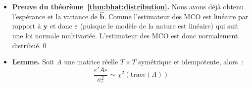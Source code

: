 \documentclass[10pt]{beamer}
\begin{document}
\begin{notes}

  \begin{itemize}

  \item \textbf{Preuve du théorème~\ref{thm:bhat:distribution}.} Nous avons déjà obtenu l'espérance et la variance de $\hat{\mathbf b}$. Comme l'estimateur des MCO est linéaire par rapport à $\mathbf y$ et donc $\varepsilon$ (puisque le modèle de la nature est linéaire) qui suit une loi normale multivariée. L'estimateur des MCO est donc normalement distribué.\qed\newline

  \item \textbf{Lemme.} Soit $A$ une matrice réelle $T\times T$ symétrique et idempotente, alors~:
       \[
         \frac{\varepsilon' A \varepsilon}{\sigma_{\varepsilon}^2} \sim \chi^2\left(\mathrm{trace}(A)\right)
       \]
       \medskip


\end{itemize}
\end{notes}
\end{document}
